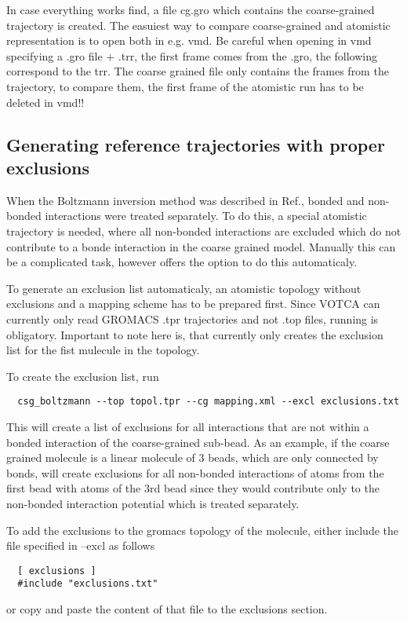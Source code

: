 In case everything works find, a file cg.gro which contains the coarse-grained trajectory is created. The easuiest way to compare coarse-grained and atomistic representation is to open both in e.g. vmd.  Be careful when opening in vmd specifying a .gro file + .trr, the first frame comes from the .gro, the following correspond to the trr. The coarse grained file only contains the frames from the trajectory, to compare them, the first frame of the atomistic run has to be deleted in vmd!!

\subsection{Generating reference trajectories with proper exclusions}
When the Boltzmann inversion method was described in Ref.\cite{Tschoep:1998}, bonded and non-bonded interactions were treated separately. To do this, a special atomistic trajectory is needed, where all non-bonded interactions are excluded which do not contribute to a bonde interaction in the coarse grained model. Manually this can be a complicated task, however  offers the option  to do this automaticaly.

To generate an exclusion list automaticaly, an atomistic topology without exclusions and a mapping scheme has to be prepared first. Since VOTCA can currently only read GROMACS .tpr trajectories and not .top files, running  is obligatory. Important to note here is, that  currently only creates the exclusion list for the fist mulecule in the topology.

To create the exclusion list, run
\begin{verbatim}
  csg_boltzmann --top topol.tpr --cg mapping.xml --excl exclusions.txt
\end{verbatim}
This will create a list of exclusions for all interactions that are not within a bonded interaction of the coarse-grained sub-bead. As an example, if the coarse grained molecule is a linear molecule of 3 beads, which are only connected by bonds,  will create exclusions for all non-bonded interactions of atoms from the first bead with atoms of the 3rd bead since they would contribute only to the non-bonded interaction potential which is treated separately.

To add the exclusions to the gromacs topology of the molecule, either include the file specified in --excl as follows
\begin{verbatim}
  [ exclusions ]
  #include "exclusions.txt"
\end{verbatim}
or copy and paste the content of that file to the exclusions section.



